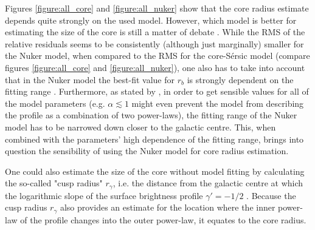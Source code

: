 \documentclass[english, oneside]{HYgradu}
\begin{document}


Figures \ref{figure:all_core} and \ref{figure:all_nuker} show that the core radius estimate depends quite strongly on the used model. However, which model is better for estimating the size of the core is still a matter of debate \citep{Lauer2007, Dullo2012}. While the RMS of the relative residuals seems to be consistently (although just marginally) smaller for the Nuker model, when compared to the RMS for the core-Sérsic model (compare figures \ref{figure:all_core} and \ref{figure:all_nuker}), one also has to take into account that in the Nuker model the best-fit value for $r_b$ is strongly dependent on the fitting range \citep{Graham2003Nuker}. Furthermore, as stated by \cite{Rantala2018}, in order to get sensible values for all of the model parameters (e.g. $\alpha \lesssim 1$ might even prevent the model from describing the profile as a combination of two power-laws), the fitting range of the Nuker model has to be narrowed down closer to the galactic centre. This, when combined with the parameters' high dependence of the fitting range, brings into question the sensibility of using the Nuker model for core radius estimation.

One could also estimate the size of the core without model fitting by calculating the so-called "cusp radius" $r_\gamma$, i.e. the distance from the galactic centre at which the logarithmic slope of the surface brightness profile $\gamma' = -1/2$ \citep{Carollo1997, Lauer2007Cusp}. Because the cusp radius $r_\gamma$ also provides an estimate for the location where the inner power-law of the profile changes into the outer power-law, it equates to the core radius. 
\end{document}
